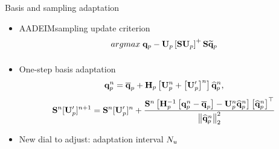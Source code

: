 \documentclass[]{beamer}
\begin{document}
\begin{frame}{Basis and sampling adaptation}
	\begin{itemize}
		\item AADEIM\footnotemark[0] sampling update criterion
		\begin{equation*}
			\argmax{} \primVec - \primTrial \left[\sampMat \primTrial\right]^+ \sampMat \primVecRom
		\end{equation*}
		\item One-step basis adaptation\footnotemark[0]
		\begin{equation*}
			\primVec^{\timeIdx} = \primVecCent + \primScale \left[\primTrial^{\timeIdx} + \left[\primTrialUpdate\right]^{\timeIdx} \right] \primVecCoef^{\timeIdx},
		\end{equation*}
		\begin{equation*}
			\sampMat^{\timeIdx} [\primTrialUpdate]^{\timeIdx+1} = \sampMat^{\timeIdx} [\primTrialUpdate]^{\timeIdx} + \frac{\sampMat^{\timeIdx} \left[\primScaleInv\left[\primVec^{\timeIdx} - \primVecCent\right] - \primTrial^{\timeIdx} \primVecCoef^{\timeIdx}\right]\left[\primVecCoef^{\timeIdx}\right]^\top}{\left\Vert \primVecCoef^{\timeIdx} \right\Vert^2_2}
		\end{equation*}
		\item New dial to adjust: adaptation interval $N_u$
	\end{itemize}
\end{frame}
\end{document}
